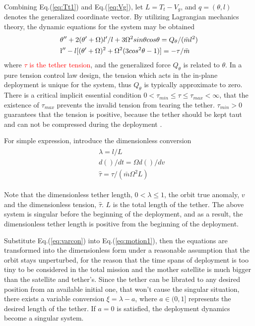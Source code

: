 \documentclass[3p]{elsarticle}
\theoremstyle{plain}
\begin{document}
Combining Eq.(\ref{eq:Tt1}) and Eq.(\ref{eq:Vg}), let $L =T_t-V_g$, and ${q}=(\theta,l)$ denotes the generalized coordinate vector. By utilizing Lagrangian mechanics theory, the dynamic equations for the system may be obtained \cite{Williams2009745}
\begin{align}
\begin{split}
&\theta''+2(\theta'+\Omega)l'/l+3\Omega^2sin{\theta} cos{\theta}=Q_\theta/(\bar{m}l^2)\\
&\l''-l[(\theta'+\Omega)^2+\Omega^2(3cos{^2\theta}-1)]= -\tau/\bar{m}\label{eq:motion1}
\end{split}
\end{align}
where \textcolor{red}{$\tau$ is the tether tension}, and the generalized force $Q_\theta$ is related to $\theta$. In a pure tension control law design, the tension which acts in the in-plane deployment is unique for the system, thus $Q_\theta$ is typically approximate to zero. There is a critical implicit essential condition $0<\tau_{min}\le \tau\le \tau_{max} < \infty$, that the existence of $\tau_{max}$ prevents the invalid tension from tearing the tether. $\tau_{min}>0$ guarantees that the tension is positive, because the tether should be kept taut and can not be compressed during the deployment \cite{williams2008deployment}.\par
For simple expression, introduce the dimensionless conversion
\begin{align}
\begin{split}
&\lambda=l/L\\
&d()/dt=\Omega d()/dv\\
&\hat{\tau}=\tau/(\bar{m}\Omega^2L)\label{eq:varcon}
\end{split}
\end{align}\par
Note that the dimensionless tether length, $0<\lambda \le 1$, the orbit true anomaly, $v$ and the dimensionless tension, $\hat{\tau}$. $L$ is the total length of the tether. The above system is singular before the beginning of the deployment, and as a result, the dimensionless tether length is positive from the beginning of the deployment.\par
Substitute Eq.(\ref{eq:varcon}) into Eq.(\ref{eq:motion1}), then the equations are transformed into the dimensionless form under a reasonable assumption that the orbit stays unperturbed, for the reason that the time spans of deployment is too tiny to be considered in the total mission and the mother satellite is much bigger than the satellite and tether's.
Since the tether can be librated to any desired position from an available initial one, that won't cause the singular situation, there exists a variable conversion $\xi =\lambda - a$, where $a\in(0,1]$ represents the desired length of the tether. If $a=0$ is satisfied, the deployment dynamics become a singular system.\par
\end{document}
